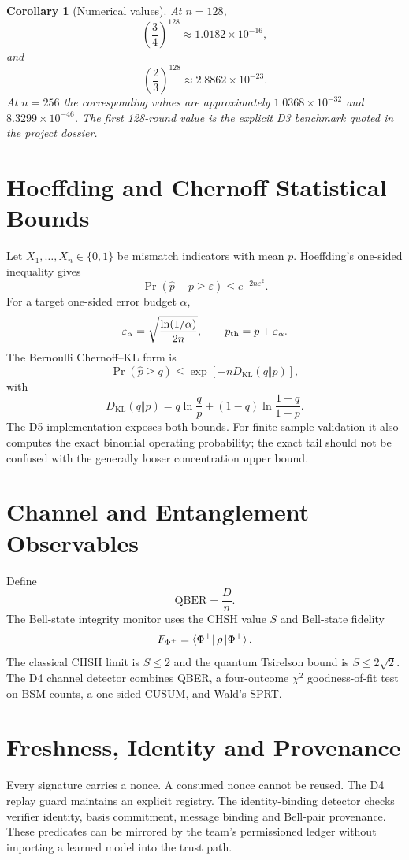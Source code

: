 \documentclass[11pt,a4paper]{article}
\newtheorem{corollary}{Corollary}
\begin{document}
\begin{corollary}[Numerical values]
At $n=128$,
\[
\left(\frac34\right)^{128}\approx 1.0182\times10^{-16},
\]
and
\[
\left(\frac23\right)^{128}\approx 2.8862\times10^{-23}.
\]
At $n=256$ the corresponding values are approximately
$1.0368\times10^{-32}$ and $8.3299\times10^{-46}$.
The first 128-round value is the explicit D3 benchmark quoted in the project
dossier.
\end{corollary}

\section{Hoeffding and Chernoff Statistical Bounds}
Let $X_1,\ldots,X_n\in\{0,1\}$ be mismatch indicators with mean $p$. Hoeffding's
one-sided inequality gives
\[
\Pr\left(\hat p-p\ge\varepsilon\right)\le e^{-2n\varepsilon^2}.
\]
For a target one-sided error budget $\alpha$,
\[
\varepsilon_\alpha=\sqrt{\frac{\ln(1/\alpha)}{2n}},
\qquad
p_{\rm th}=p+\varepsilon_\alpha.
\]
The Bernoulli Chernoff--KL form is
\[
\Pr(\hat p\ge q)\le
\exp\left[-nD_{\mathrm{KL}}(q\Vert p)\right],
\]
with
\[
D_{\mathrm{KL}}(q\Vert p)=q\ln\frac qp+(1-q)\ln\frac{1-q}{1-p}.
\]
The D5 implementation exposes both bounds. For finite-sample validation it
also computes the exact binomial operating probability; the exact tail should
not be confused with the generally looser concentration upper bound.

\section{Channel and Entanglement Observables}
Define
\[
\mathrm{QBER}=\frac{D}{n}.
\]
The Bell-state integrity monitor uses the CHSH value $S$ and Bell-state fidelity
\[
F_{\Phi^+}=\bra{\Phi^+}\rho\ket{\Phi^+}.
\]
The classical CHSH limit is $S\le2$ and the quantum Tsirelson bound is
$S\le2\sqrt2$. The D4 channel detector combines QBER, a four-outcome $\chi^2$
goodness-of-fit test on BSM counts, a one-sided CUSUM, and Wald's SPRT.

\section{Freshness, Identity and Provenance}
Every signature carries a nonce. A consumed nonce cannot be reused. The D4
replay guard maintains an explicit registry. The identity-binding detector
checks verifier identity, basis commitment, message binding and Bell-pair
provenance. These predicates can be mirrored by the team's permissioned ledger
without importing a learned model into the trust path.
\end{document}
